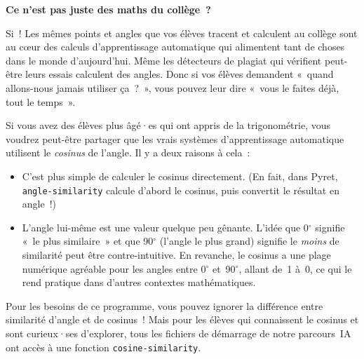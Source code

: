 \documentclass[12pt,a4paper]{article}
\begin{document}
\begin{instructornotes}
  \textbf{Ce n'est pas juste des maths du collège~?}

  Si~! Les mêmes points et angles que vos élèves tracent et calculent au collège sont au cœur des calculs d'apprentissage automatique qui alimentent tant de choses dans le monde d'aujourd'hui. Même les détecteurs de plagiat qui vérifient peut-être leurs essais calculent des angles. Donc si vos élèves demandent «~quand allons-nous jamais utiliser ça~?~», vous pouvez leur dire «~vous le faites déjà, tout le temps~».

  \vspace{0.3em}
  Si vous avez des élèves plus âgé·es qui ont appris de la trigonométrie, vous voudrez peut-être partager que les vrais systèmes d'apprentissage automatique utilisent le \emph{cosinus} de l'angle. Il y a deux raisons à cela~:
  \begin{itemize}
    \item C'est plus simple de calculer le cosinus directement. (En fait, dans Pyret, \texttt{angle-similarity} calcule d'abord le cosinus, puis convertit le résultat en angle~!)
    \item L'angle lui-même est une valeur quelque peu gênante. L'idée que 0$^\circ$ signifie «~le plus similaire~» et que 90$^\circ$ (l'angle le plus grand) signifie le \emph{moins} de similarité peut être contre-intuitive. En revanche, le cosinus a une plage numérique agréable pour les angles entre 0$^\circ$ et~90$^\circ$, allant de~1 à~0, ce qui le rend pratique dans d'autres contextes mathématiques.
  \end{itemize}

  Pour les besoins de ce programme, vous pouvez ignorer la différence entre similarité d'angle et de cosinus~! Mais pour les élèves qui connaissent le cosinus et sont curieux·ses d'explorer, tous les fichiers de démarrage de notre parcours~IA ont accès à une fonction \texttt{cosine-similarity}.
\end{instructornotes}
\end{document}
